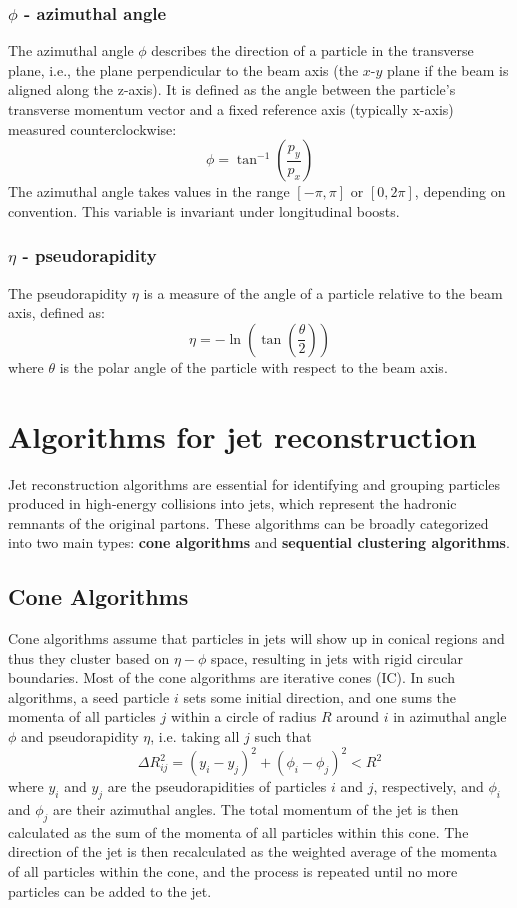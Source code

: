 \subsubsection{$\phi$ - azimuthal angle}
The azimuthal angle $\phi$ describes the direction of a particle in the transverse plane, i.e., the plane perpendicular to the beam axis (the $x\text{-}y$ plane if the beam is aligned along the z-axis).
It is defined as the angle between the particle’s transverse momentum vector and a fixed reference axis (typically x-axis) measured counterclockwise:
\begin{equation}
    \phi = \tan^{-1}\left(\frac{p_y}{p_x}\right)
\end{equation}
The azimuthal angle takes values in the range $[-\pi, \pi]$ or $[0, 2\pi]$, depending on convention.
This variable is invariant under longitudinal boosts.
\subsubsection{$\eta$ - pseudorapidity}
The pseudorapidity $\eta$ is a measure of the angle of a particle relative to the beam axis, defined as:
\begin{equation}
    \eta = -\ln\left(\tan\left(\frac{\theta}{2}\right)\right)
\end{equation}
where $\theta$ is the polar angle of the particle with respect to the beam axis.


\section{Algorithms for jet reconstruction}
Jet reconstruction algorithms are essential for identifying and grouping particles produced in high-energy collisions into jets, which represent the hadronic remnants of the original partons. These algorithms can be broadly categorized into two main types: \textbf{cone algorithms} and \textbf{sequential clustering algorithms}.

\subsection{Cone Algorithms}
Cone algorithms assume that particles in jets will show up in conical regions and thus they cluster based on $\eta - \phi $ space, resulting in jets with rigid circular boundaries.
Most of the cone algorithms are iterative cones (IC). In such algorithms, a seed particle $i$ sets some initial direction, and one sums the momenta of all particles $j$ within a circle of radius $R$ around $i$ in azimuthal angle $\phi$ and pseudorapidity $\eta$, i.e. taking all $j$ such that 
\begin{equation}
    \Delta R_{ij}^2 = (y_i - y_j)^2 + (\phi_i - \phi_j)^2 < R^2
\end{equation}
where $y_i$ and $y_j$ are the pseudorapidities of particles $i$ and $j$, respectively, and $\phi_i$ and $\phi_j$ are their azimuthal angles. The total momentum of the jet is then calculated as the sum of the momenta of all particles within this cone.
The direction of the jet is then recalculated as the weighted average of the momenta of all particles within the cone, and the process is repeated until no more particles can be added to the jet.

